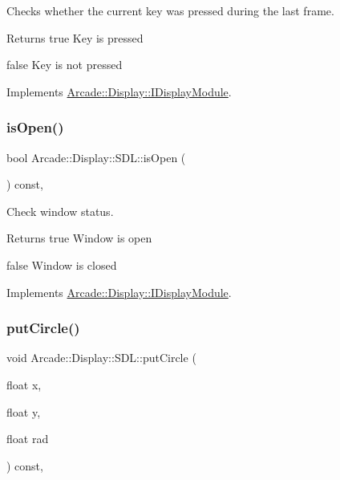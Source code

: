 Checks whether the current key was pressed during the last frame. 

\begin{DoxyReturn}{Returns}
true Key is pressed 

false Key is not pressed 
\end{DoxyReturn}


Implements \mbox{\hyperlink{classArcade_1_1Display_1_1IDisplayModule_ac347fc77c01e12c5ce23be99d357008d}{Arcade\+::\+Display\+::\+I\+Display\+Module}}.

\mbox{\label{classArcade_1_1Display_1_1SDL_a7d86c934d5dde9283e9c70816cf9c8a5}} 
\subsubsection{\texorpdfstring{isOpen()}{isOpen()}}
{\footnotesize\ttfamily bool Arcade\+::\+Display\+::\+S\+D\+L\+::is\+Open (\begin{DoxyParamCaption}{ }\end{DoxyParamCaption}) const\hspace{0.3cm}{\ttfamily [final]}, {\ttfamily [virtual]}}



Check window status. 

\begin{DoxyReturn}{Returns}
true Window is open 

false Window is closed 
\end{DoxyReturn}


Implements \mbox{\hyperlink{classArcade_1_1Display_1_1IDisplayModule_a34c86dd2e7aa60a70c0cc06ccbd34e47}{Arcade\+::\+Display\+::\+I\+Display\+Module}}.

\mbox{\label{classArcade_1_1Display_1_1SDL_af289c27eb970e81918b4cca36f25e0cf}} 
\subsubsection{\texorpdfstring{putCircle()}{putCircle()}}
{\footnotesize\ttfamily void Arcade\+::\+Display\+::\+S\+D\+L\+::put\+Circle (\begin{DoxyParamCaption}\item[{float}]{x,  }\item[{float}]{y,  }\item[{float}]{rad }\end{DoxyParamCaption}) const\hspace{0.3cm}{\ttfamily [final]}, {\ttfamily [virtual]}}



